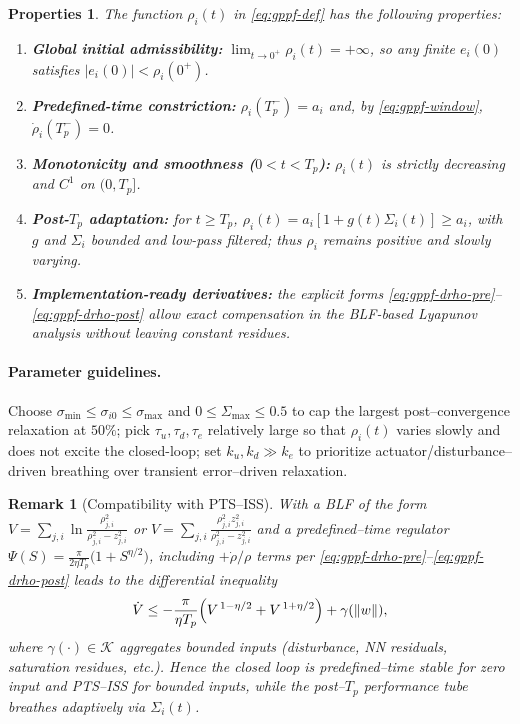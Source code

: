 \documentclass[pdflatex,sn-mathphys-num]{sn-jnl}%
\theoremstyle{thmstyleone}%
\theoremstyle{thmstyletwo}%
\newtheorem{remark}{Remark}%
\newtheorem{properties}{Properties}%
\theoremstyle{thmstylethree}%
\begin{document}
\begin{properties}
The function $\rho_i(t)$ in \eqref{eq:gppf-def} has the following properties:
\begin{enumerate}
\item \textbf{Global initial admissibility:} $\displaystyle\lim_{t\to0^+}\rho_i(t)=+\infty$, so any finite $e_i(0)$ satisfies $|e_i(0)|<\rho_i(0^+)$.
\item \textbf{Predefined-time constriction:} $\rho_i(T_p^-)=a_i$ and, by \eqref{eq:gppf-window}, $\dot\rho_i(T_p^-)=0$.
\item \textbf{Monotonicity and smoothness ($0<t<T_p$):} $\rho_i(t)$ is strictly decreasing and $C^1$ on $(0,T_p]$.
\item \textbf{Post-$T_p$ adaptation:} for $t\ge T_p$, $\rho_i(t)=a_i[1+g(t)\Sigma_i(t)]\ge a_i$, with $g$ and $\Sigma_i$ bounded and low-pass filtered; thus $\rho_i$ remains positive and slowly varying.
\item \textbf{Implementation-ready derivatives:} the explicit forms \eqref{eq:gppf-drho-pre}–\eqref{eq:gppf-drho-post} allow exact compensation in the BLF-based Lyapunov analysis without leaving constant residues.
\end{enumerate}
\end{properties}
\paragraph{Parameter guidelines.}
Choose $\sigma_{\min}\le\sigma_{i0}\le\sigma_{\max}$ and $0\le\Sigma_{\max}\le 0.5$ to cap the largest post–convergence relaxation at $50\%$; pick $\tau_u,\tau_d,\tau_e$ relatively large so that $\rho_i(t)$ varies slowly and does not excite the closed-loop; set $k_u,k_d\gg k_e$ to prioritize actuator/disturbance–driven breathing over transient error–driven relaxation.

\begin{remark}[Compatibility with PTS–ISS]
With a BLF of the form $V=\sum_{j,i}\ln\frac{\rho_{j,i}^2}{\rho_{j,i}^2-z_{j,i}^2}$ or $V=\sum_{j,i}\frac{\rho_{j,i}^2 z_{j,i}^2}{\rho_{j,i}^2-z_{j,i}^2}$ and a predefined–time regulator
$\Psi(S)=\frac{\pi}{2\eta T_p}\bigl(1+S^{\eta/2}\bigr)$,
including $+\dot\rho/\rho$ terms per \eqref{eq:gppf-drho-pre}–\eqref{eq:gppf-drho-post}
leads to the differential inequality
\[
\dot V \le -\frac{\pi}{\eta T_p}\Bigl(V^{\,1-\eta/2}+V^{\,1+\eta/2}\Bigr)+\gamma(\|w\|),
\]
where $\gamma(\cdot)\in\mathcal K$ aggregates bounded inputs (disturbance, NN residuals, saturation residues, etc.). Hence the closed loop is predefined–time stable for zero input and PTS–ISS for bounded inputs, while the post–$T_p$ performance tube breathes adaptively via $\Sigma_i(t)$.
\end{remark}
\end{document}
